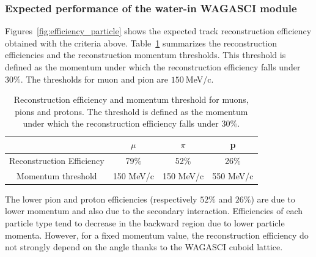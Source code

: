 \subsubsection{Expected performance of the water-in WAGASCI module}
\label{sec:mc_waterin}
Figures~\ref{fig:efficiency_particle} shows the expected track reconstruction efficiency obtained with the criteria above.
Table~\ref{tab:reconstructedparticles} summarizes the reconstruction efficiencies and the reconstruction momentum thresholds.
This threshold is defined as the momentum under which the reconstruction efficiency falls under $30\%$.
The thresholds for muon and pion are $150~$MeV/c. %
\begin{table}[htbp]
  \begin{center}
    \caption{\label{tab:reconstructedparticles} Reconstruction efficiency and momentum threshold for muons, pions and protons.
The threshold is defined as the momentum under which the reconstruction efficiency falls under $30\%$.}
    \begin{tabular}{c|ccc}
      \hline
      & $\mu$ & $\pi$ & p \\
      \hline
      Reconstruction Efficiency & 79\% & 52\% & 26\% \\\hline
      Momentum threshold & 150 MeV/c & 150 MeV/c & 550 MeV/c \\
      \hline
    \end{tabular}
  \end{center}
\end{table}
The lower pion and proton efficiencies (respectively $52\%$ and $26\%$) are due to lower momentum and also due to the secondary interaction.
Efficiencies of each particle type tend to decrease in the backward region due to lower particle momenta.
However, for a fixed momentum value, the reconstruction efficiency do not strongly depend on the angle thanks to the WAGASCI cuboid lattice. 
